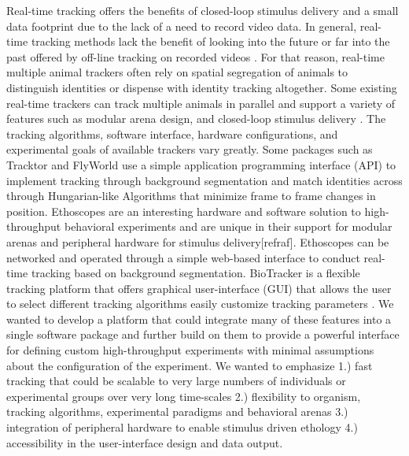 \documentclass[10pt]{article}
\begin{document}
\begin{multicols}{2}
Real-time tracking offers the benefits of closed-loop stimulus delivery and a small data footprint due to the lack of a need to record video data. In general, real-time tracking methods lack the benefit of looking into the future or far into the past offered by off-line tracking on recorded videos \cite{Itskovits_A_2017}. For that reason, real-time multiple animal trackers often rely on spatial segregation of animals to distinguish identities or dispense with identity tracking altogether\cite{Liu_A_2018}. Some existing real-time trackers can track multiple animals in parallel and support a variety of features such as modular arena design, and closed-loop stimulus delivery \cite{}. The tracking algorithms, software interface, hardware configurations, and experimental goals of available trackers vary greatly. Some packages such as Tracktor and FlyWorld use a simple application programming interface (API) to implement tracking through background segmentation and match identities across through Hungarian-like Algorithms that minimize frame to frame changes in position. Ethoscopes are an interesting hardware and software solution to high-throughput behavioral experiments and are unique in their support for modular arenas and peripheral hardware for stimulus delivery[refraf]. Ethoscopes can be networked and operated through a simple web-based interface to conduct real-time tracking based on background segmentation. BioTracker is a flexible tracking platform that offers graphical user-interface (GUI) that allows the user to select different tracking algorithms easily customize tracking parameters \cite{Mnck_BioTracker_2018}. We wanted to develop a platform that could integrate many of these features into a single software package and further build on them to provide a powerful interface for defining custom high-throughput experiments with minimal assumptions about the configuration of the experiment. We wanted to emphasize 1.) fast tracking that could be scalable to very large numbers of individuals or experimental groups over very long time-scales 2.) flexibility to organism, tracking algorithms, experimental paradigms and behavioral arenas 3.) integration of peripheral hardware to enable stimulus driven ethology 4.) accessibility in the user-interface design and data output. 


\end{multicols}
\end{document}
